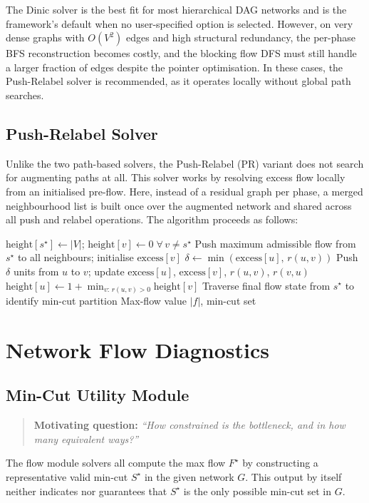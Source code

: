 \documentclass[12pt]{report}
\begin{document}
The Dinic solver is the best fit for most hierarchical DAG networks and is the framework's default when no user-specified option is selected. However, on very dense graphs with $O(V^2)$ edges and high structural redundancy, the per-phase BFS reconstruction becomes costly, and the blocking flow DFS must still handle a larger fraction of edges despite the pointer optimisation. In these cases, the Push-Relabel solver is recommended, as it operates locally without global path searches.

\subsection{Push-Relabel Solver}
Unlike the two path-based solvers, the Push-Relabel (PR) variant does not search for augmenting paths at all. This solver works by resolving excess flow locally from an initialised pre-flow.
Here, instead of a residual graph per phase, a merged neighbourhood list is built once over the augmented network and shared across all push and relabel operations. The algorithm proceeds as follows:

\begin{algorithm}[h]
\caption{Push-Relabel Min-Cut Max-Flow}
\label{alg:pr-minmax}
\begin{algorithmic}[1]
\STATE $\text{height}[s^\star] \gets |V|$; \quad $\text{height}[v] \gets 0 \;\forall\, v \neq s^\star$
\STATE Push maximum admissible flow from $s^\star$ to all neighbours; initialise $\text{excess}[v]$
        \STATE $\delta \gets \min(\text{excess}[u],\, r(u,v))$
        \STATE Push $\delta$ units from $u$ to $v$; update $\text{excess}[u]$, $\text{excess}[v]$, $r(u,v)$, $r(v,u)$
    \ELSE
        \STATE $\text{height}[u] \gets 1 + \min_{v:\, r(u,v)>0} \text{height}[v]$ 
    \ENDIF
\ENDWHILE
\STATE Traverse final flow state from $s^\star$ to identify min-cut partition
\RETURN Max-flow value $|f|$, min-cut set
\end{algorithmic}
\end{algorithm}



\FloatBarrier
\section{Network Flow Diagnostics}
\subsection{Min-Cut Utility Module}
\begin{quote}
    \textbf{Motivating question:} \textit{``How constrained is the bottleneck, and in how many equivalent ways?''}
\end{quote}
The flow module solvers all compute the max flow $F^\star$ by constructing a representative valid min-cut $S^\star$ in the given network $G$. This output by itself neither indicates nor guarantees that $S^\star$ is the only possible min-cut set in $G$.
\end{document}
